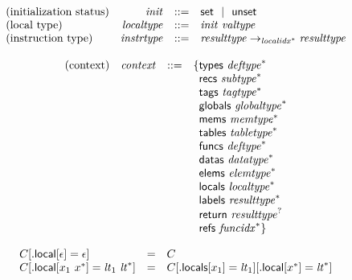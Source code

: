 \vspace{1ex}

$$
\begin{array}[t]{@{}lrrl@{}l@{}}
\mbox{(initialization status)} & {\mathit{init}} & ::= & \mathsf{set} ~~|~~ \mathsf{unset} \\
\mbox{(local type)} & {\mathit{localtype}} & ::= & {\mathit{init}}~{\mathit{valtype}} \\
\mbox{(instruction type)} & {\mathit{instrtype}} & ::= & {\mathit{resulttype}} \rightarrow_{{{\mathit{localidx}}^\ast}} {\mathit{resulttype}} \\
\end{array}
$$

\vspace{1ex}

\vspace{1ex}

$$
\begin{array}[t]{@{}lrrl@{}l@{}}
\mbox{(context)} & {\mathit{context}} & ::= & \{ \begin{array}[t]{@{}l@{}l@{}}
\mathsf{types}~{{\mathit{deftype}}^\ast} \\
\mathsf{recs}~{{\mathit{subtype}}^\ast} \\
\mathsf{tags}~{{\mathit{tagtype}}^\ast} \\
\mathsf{globals}~{{\mathit{globaltype}}^\ast} \\
\mathsf{mems}~{{\mathit{memtype}}^\ast} \\
\mathsf{tables}~{{\mathit{tabletype}}^\ast} \\
\mathsf{funcs}~{{\mathit{deftype}}^\ast} \\
\mathsf{datas}~{{\mathit{datatype}}^\ast} \\
\mathsf{elems}~{{\mathit{elemtype}}^\ast} \\
\mathsf{locals}~{{\mathit{localtype}}^\ast} \\
\mathsf{labels}~{{\mathit{resulttype}}^\ast} \\
\mathsf{return}~{{\mathit{resulttype}}^?} \\
\mathsf{refs}~{{\mathit{funcidx}}^\ast} \} \\
\end{array} \\
\end{array}
$$

\vspace{1ex}

$$
\begin{array}[t]{@{}lcl@{}l@{}}
C{}[{.}\mathsf{local}{}[\epsilon] = \epsilon] & = & C \\
C{}[{.}\mathsf{local}{}[x_1~{x^\ast}] = {{\mathit{lt}}}_1~{{{\mathit{lt}}}^\ast}] & = & C{}[{.}\mathsf{locals}{}[x_1] = {{\mathit{lt}}}_1]{}[{.}\mathsf{local}{}[{x^\ast}] = {{{\mathit{lt}}}^\ast}] \\
\end{array}
$$

